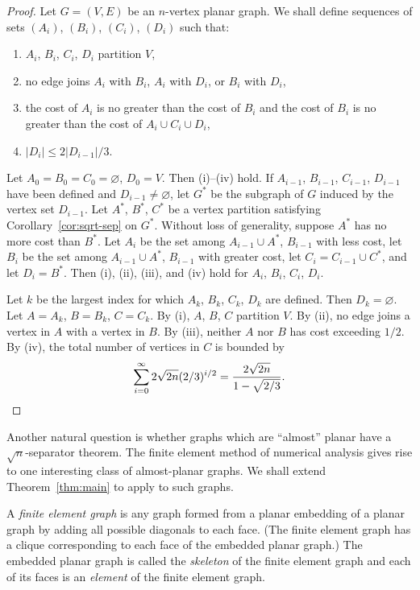 \documentclass[12pt]{article}
\theoremstyle{remark}
\begin{document}
\begin{proof}
Let $G = (V, E)$ be an $n$-vertex planar graph. We shall define sequences of sets
$(A_i)$, $(B_i)$, $(C_i)$, $(D_i)$ such that:
\begin{enumerate}[label=(\roman*)]
\item $A_i$, $B_i$, $C_i$, $D_i$ partition $V$,
\item no edge joins $A_i$ with $B_i$, $A_i$ with $D_i$, or $B_i$ with $D_i$,
\item the cost of $A_i$ is no greater than the cost of $B_i$ and the cost of $B_i$
      is no greater than the cost of $A_i \cup C_i \cup D_i$,
\item $|D_i| \leq 2|D_{i-1}|/3$.
\end{enumerate}

Let $A_0 = B_0 = C_0 = \varnothing$, $D_0 = V$. Then (i)--(iv) hold. If $A_{i-1}$,
$B_{i-1}$, $C_{i-1}$, $D_{i-1}$ have been defined and $D_{i-1} \neq \varnothing$,
let $G^*$ be the subgraph of $G$ induced by the vertex set $D_{i-1}$. Let $A^*$,
$B^*$, $C^*$ be a vertex partition satisfying Corollary~\ref{cor:sqrt-sep} on $G^*$.
Without loss of generality, suppose $A^*$ has no more cost than $B^*$. Let $A_i$ be
the set among $A_{i-1} \cup A^*$, $B_{i-1}$ with less cost, let $B_i$ be the set
among $A_{i-1} \cup A^*$, $B_{i-1}$ with greater cost, let $C_i = C_{i-1} \cup C^*$,
and let $D_i = B^*$. Then (i), (ii), (iii), and (iv) hold for $A_i$, $B_i$, $C_i$,
$D_i$.

Let $k$ be the largest index for which $A_k$, $B_k$, $C_k$, $D_k$ are defined.
Then $D_k = \varnothing$. Let $A = A_k$, $B = B_k$, $C = C_k$. By (i), $A$, $B$, $C$
partition $V$. By (ii), no edge joins a vertex in $A$ with a vertex in $B$. By (iii),
neither $A$ nor $B$ has cost exceeding $1/2$. By (iv), the total number of vertices
in $C$ is bounded by
\[
\sum_{i=0}^{\infty} 2\sqrt{2n}(2/3)^{i/2} = \frac{2\sqrt{2n}}{1 - \sqrt{2/3}}. \qedhere
\]
\end{proof}

Another natural question is whether graphs which are ``almost'' planar have a
$\sqrt{n}$-separator theorem. The finite element method of numerical analysis gives
rise to one interesting class of almost-planar graphs. We shall extend
Theorem~\ref{thm:main} to apply to such graphs.

A \emph{finite element graph} is any graph formed from a planar embedding of a
planar graph by adding all possible diagonals to each face. (The finite element graph
has a clique corresponding to each face of the embedded planar graph.) The embedded
planar graph is called the \emph{skeleton} of the finite element graph and each of
its faces is an \emph{element} of the finite element graph.
\end{document}
